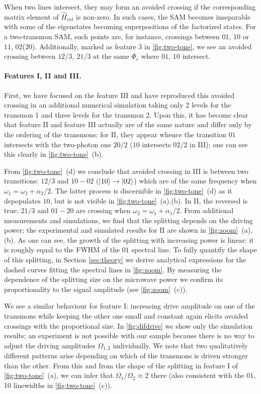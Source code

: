 \documentclass[%
 pra,
 amsmath,amssymb,
 reprint,%
]{revtex4-1}
\begin{document}
When two lines intersect, they may form an 
avoided crossing if the corresponding matrix 
element of $\hat H_{int}$ is non-zero. In such 
cases, the SAM becomes inseparable with some of 
the eigenstates becoming superpositions of the 
factorized states. For a two-transmon SAM, such 
points are, for instance, crossings between 
${01}$, ${10}$ or $ {11} $, $ {02} $($ {20} $). 
Additionally, marked as feature 3 in 
\autoref{fig:two-tone}, we see an avoided 
crossing between ${12}/3,\ {21}/3$ at the same 
$\Phi_e$ where ${01}$, ${10}$ intersect.


\paragraph{Features I, II and III.} First, we have focused on the feature III and have reproduced this avoided crossing in an additional numerical simulation taking only 2 levels for the transmon 1 and three levels for the transmon 2. Upon this, it has become clear that feature II and feature III actually are of the same nature and differ only by the ordering of the transmons: for II, they appear whence the transition ${01}$ intersects with the two-photon one ${20/2}$ (${10}$ intersects ${02/2}$ in III); one can see this clearly in \autoref{fig:two-tone}~(b).

From \autoref{fig:two-tone}~(d) we conclude that 
avoided crossing in III is between two 
transitions: ${12/3}$ and ${10} - {02}$ 
($\ket{10}\rightarrow\ket{02}$) which are of the 
same frequency when $\omega_1 = 
\omega_2+\alpha_2/2$. The latter process is 
discernible in \autoref{fig:two-tone}~(d) as it 
depopulates ${10}$, but is not visible in 
\autoref{fig:two-tone}~(a),(b). In II, the 
reversed is true: ${21/3}$ and ${01} - {20}$ are 
crossing when $\omega_2 = \omega_1+\alpha_1/2$. 
From additional measurements and simulations, we 
find that the splitting depends on the driving 
power; the experimental and simulated results for 
II are shown in \autoref{fig:zoom}~(a), (b). As 
one can see, the growth of the splitting with 
increasing power is linear: it is roughly equal 
to the FWHM of the ${01}$ spectral line. To fully 
quantify the shape of this splitting, in Section 
\ref{sec:theory} we derive analytical expressions 
for the dashed curves fitting the spectral lines 
in \autoref{fig:zoom}. By measuring the 
dependence of the splitting size on the microwave 
power we confirm its proportionality to the 
signal amplitude (see \autoref{fig:zoom}~(c)).

We see a similar behaviour for feature I: 
increasing drive amplitude on one of the 
transmons while keeping the other one small and 
constant again elicits avoided crossings with the 
proportional size. In \autoref{fig:difdrive} we 
show only the simulation results; an experiment 
is not possible with our sample because there is 
no way to adjust the driving amplitudes 
$\Omega_{1,2}$ individually. We note that two 
qualitatively different patterns arise depending 
on which of the transmons is driven stronger than 
the other. From this and from the shape of the 
splitting in feature I of 
\autoref{fig:two-tone}~(a), we can infer that 
$\Omega_1/\Omega_2 \approx 2$ there (also 
consistent with the 01, 10 linewidths in 
\autoref{fig:two-tone}~(c)).
\end{document}
